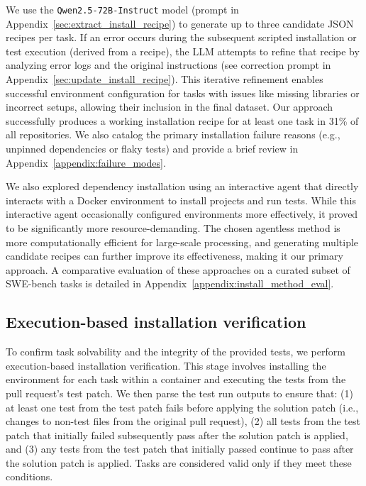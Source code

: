 \documentclass[dandb]{article}
\begin{document}
We use the \texttt{Qwen2.5-72B-Instruct} model \citep{qwen2025qwen25technicalreport} (prompt in Appendix~\ref{sec:extract_install_recipe}) to generate up to three candidate JSON recipes per task. If an error occurs during the subsequent scripted installation or test execution (derived from a recipe), the LLM attempts to refine that recipe by analyzing error logs and the original instructions (see correction prompt in Appendix~\ref{sec:update_install_recipe}). This iterative refinement enables successful environment configuration for tasks with issues like missing libraries or incorrect setups, allowing their inclusion in the final dataset. Our approach successfully produces a working installation recipe for at least one task in 31\% of all repositories. We also catalog the primary installation failure reasons (e.g., unpinned dependencies or flaky tests) and provide a brief review in Appendix~\ref{appendix:failure_modes}.

We also explored dependency installation using an interactive agent that directly interacts with a Docker environment to install projects and run tests. While this interactive agent occasionally configured environments more effectively, it proved to be significantly more resource-demanding. The chosen agentless method is more computationally efficient for large-scale processing, and generating multiple candidate recipes can further improve its effectiveness, making it our primary approach. A comparative evaluation of these approaches on a curated subset of SWE-bench tasks is detailed in Appendix~\ref{appendix:install_method_eval}.

\subsection{Execution-based installation verification}
\label{sec:exec_based_verification}

To confirm task solvability and the integrity of the provided tests, we perform execution-based installation verification. This stage involves installing the environment for each task within a container and executing the tests from the pull request's test patch. We then parse the test run outputs to ensure that: (1) at least one test from the test patch fails before applying the solution patch (i.e., changes to non-test files from the original pull request), (2) all tests from the test patch that initially failed subsequently pass after the solution patch is applied, and (3) any tests from the test patch that initially passed continue to pass after the solution patch is applied. Tasks are considered valid only if they meet these conditions.
\end{document}
